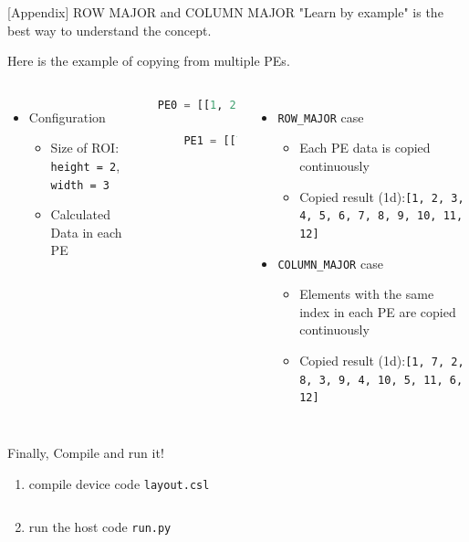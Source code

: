 \documentclass[dvipdfmx, 11pt, aspectratio=169]{beamer}   %
\begin{document}
\begin{frame}[fragile]{[Appendix] ROW MAJOR and COLUMN MAJOR}
"Learn by example" is the best way to understand the concept.

Here is the example of copying from multiple PEs.
\begin{columns}
\begin{itemize}
    \item Configuration
    \begin{itemize}
        \item Size of ROI: \lstinline|height = 2|, \lstinline|width = 3|
        \item Calculated Data in each PE 
    \end{itemize}
\end{itemize}
\begin{lstlisting}[language=python]
    PE0 = [[1, 2, 3],
            [4, 5, 6]]
    PE1 = [[7, 8, 9],
            [10, 11, 12]]
\end{lstlisting}
\begin{itemize}
    \item \lstinline|ROW_MAJOR| case
    \begin{itemize}
        \item Each PE data is copied continuously
        \item Copied result (1d):\lstinline|[1, 2, 3, 4, 5, 6, 7, 8, 9, 10, 11, 12]|
    \end{itemize}
    \item \lstinline|COLUMN_MAJOR| case
    \begin{itemize}
        \item Elements with the same index in each PE are copied continuously
        \item Copied result (1d):\lstinline|[1, 7, 2, 8, 3, 9, 4, 10, 5, 11, 6, 12]|
    \end{itemize}
\end{itemize}
\end{columns}
\end{frame}
\begin{frame}[fragile]{Finally, Compile and run it!}
\begin{enumerate}
    \item compile device code \lstinline|layout.csl|
\end{enumerate}
\begin{lstlisting}[language=bash]

\end{lstlisting}
\begin{enumerate}\setcounter{enumi}{1}
    \item run the host code \lstinline|run.py|
\end{enumerate}
\begin{lstlisting}[language=bash]

\end{lstlisting}
\end{frame}
\end{document}
